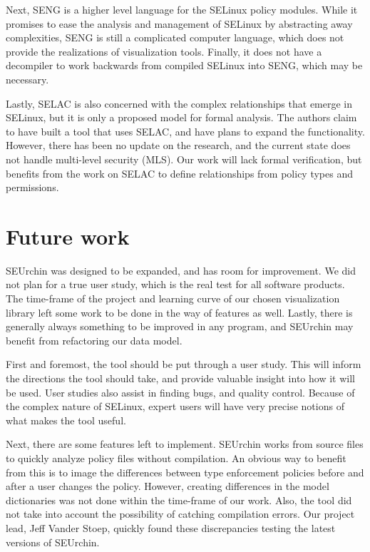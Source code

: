 \documentclass[conference]{IEEEtran}
\begin{document}
Next, SENG is a higher level language for the SELinux policy modules\cite{kuliniewicz2006seng}. While it promises to ease the analysis and management of SELinux by abstracting away complexities, SENG is still a complicated computer language, which does not provide the realizations of visualization tools. Finally, it does not have a decompiler to work backwards from compiled SELinux into SENG, which may be necessary.

Lastly, SELAC \cite{zanin2004towards} is also concerned with the complex relationships that emerge in SELinux, but it is only a proposed model for formal analysis. The authors claim to have built a tool that uses SELAC, and have plans to expand the functionality. However, there has been no update on the research, and the current state does not handle multi-level security (MLS). Our work will lack formal verification, but benefits from the work on SELAC to define relationships from policy types and permissions.

\section{Future work}\label{sec:future}
SEUrchin was designed to be expanded, and has room for improvement. We did not plan for a true user study, which is the real test for all software products. The time-frame of the project and learning curve of our chosen visualization library left some work to be done in the way of features as well. Lastly, there is generally always something to be improved in any program, and SEUrchin may benefit from refactoring our data model.

First and foremost, the tool should be put through a user study. This will inform the directions the tool should take, and provide valuable insight into how it will be used. User studies also assist in finding bugs, and quality control. Because of the complex nature of SELinux, expert users will have very precise notions of what makes the tool useful.

Next, there are some features left to implement. SEUrchin works from source files to quickly analyze policy files without compilation. An obvious way to benefit from this is to image the differences between type enforcement policies before and after a user changes the policy. However, creating differences in the model dictionaries was not done within the time-frame of our work. Also, the tool did not take into account the possibility of catching compilation errors. Our project lead, Jeff Vander Stoep, quickly found these discrepancies testing the latest versions of SEUrchin.
\end{document}
